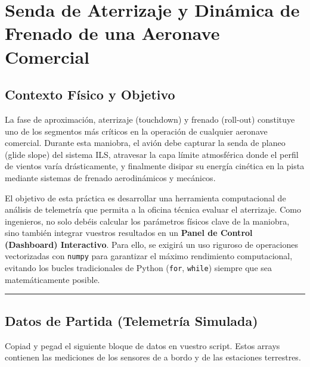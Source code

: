 
\section{Senda de Aterrizaje y Dinámica de Frenado de una Aeronave Comercial}

	\subsection*{Contexto Físico y Objetivo}
	
	La fase de aproximación, aterrizaje (touchdown) y frenado (roll-out) constituye uno de los segmentos más críticos en la operación de cualquier aeronave comercial. Durante esta maniobra, el avión debe capturar la senda de planeo (glide slope) del sistema ILS, atravesar la capa límite atmosférica donde el perfil de vientos varía drásticamente, y finalmente disipar su energía cinética en la pista mediante sistemas de frenado aerodinámicos y mecánicos.
	
	El objetivo de esta práctica es desarrollar 
	una herramienta computacional de análisis 
	de telemetría que permita a la oficina técnica 
	evaluar el aterrizaje. Como ingenieros, no solo debéis calcular los parámetros físicos clave de la maniobra, sino también integrar vuestros resultados en un \textbf{Panel de Control (Dashboard) Interactivo}. Para ello, se exigirá un uso riguroso de operaciones vectorizadas con \texttt{numpy} para garantizar el máximo rendimiento computacional, evitando los bucles tradicionales de Python (\texttt{for}, \texttt{while}) siempre que sea matemáticamente posible.
	
	\vspace{0.3cm}
	\hrule
	\vspace{0.3cm}
	
	\subsection*{Datos de Partida (Telemetría Simulada)}
	
	Copiad y pegad el siguiente bloque de datos en vuestro script. Estos arrays contienen las mediciones de los sensores de a bordo y de las estaciones terrestres.
	
